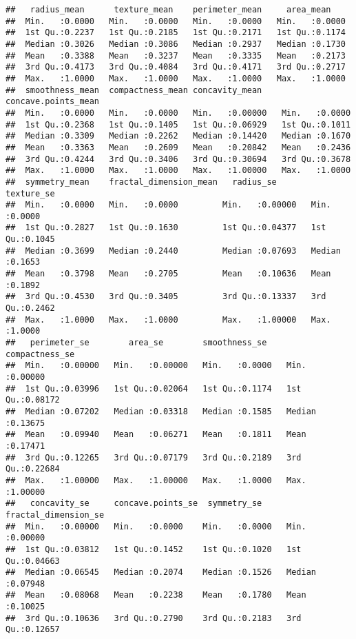 \documentclass[
]{article}
\begin{document}
\begin{verbatim}
##   radius_mean      texture_mean    perimeter_mean     area_mean     
##  Min.   :0.0000   Min.   :0.0000   Min.   :0.0000   Min.   :0.0000  
##  1st Qu.:0.2237   1st Qu.:0.2185   1st Qu.:0.2171   1st Qu.:0.1174  
##  Median :0.3026   Median :0.3086   Median :0.2937   Median :0.1730  
##  Mean   :0.3388   Mean   :0.3237   Mean   :0.3335   Mean   :0.2173  
##  3rd Qu.:0.4173   3rd Qu.:0.4084   3rd Qu.:0.4171   3rd Qu.:0.2717  
##  Max.   :1.0000   Max.   :1.0000   Max.   :1.0000   Max.   :1.0000  
##  smoothness_mean  compactness_mean concavity_mean    concave.points_mean
##  Min.   :0.0000   Min.   :0.0000   Min.   :0.00000   Min.   :0.0000     
##  1st Qu.:0.2368   1st Qu.:0.1405   1st Qu.:0.06929   1st Qu.:0.1011     
##  Median :0.3309   Median :0.2262   Median :0.14420   Median :0.1670     
##  Mean   :0.3363   Mean   :0.2609   Mean   :0.20842   Mean   :0.2436     
##  3rd Qu.:0.4244   3rd Qu.:0.3406   3rd Qu.:0.30694   3rd Qu.:0.3678     
##  Max.   :1.0000   Max.   :1.0000   Max.   :1.00000   Max.   :1.0000     
##  symmetry_mean    fractal_dimension_mean   radius_se         texture_se    
##  Min.   :0.0000   Min.   :0.0000         Min.   :0.00000   Min.   :0.0000  
##  1st Qu.:0.2827   1st Qu.:0.1630         1st Qu.:0.04377   1st Qu.:0.1045  
##  Median :0.3699   Median :0.2440         Median :0.07693   Median :0.1653  
##  Mean   :0.3798   Mean   :0.2705         Mean   :0.10636   Mean   :0.1892  
##  3rd Qu.:0.4530   3rd Qu.:0.3405         3rd Qu.:0.13337   3rd Qu.:0.2462  
##  Max.   :1.0000   Max.   :1.0000         Max.   :1.00000   Max.   :1.0000  
##   perimeter_se        area_se        smoothness_se    compactness_se   
##  Min.   :0.00000   Min.   :0.00000   Min.   :0.0000   Min.   :0.00000  
##  1st Qu.:0.03996   1st Qu.:0.02064   1st Qu.:0.1174   1st Qu.:0.08172  
##  Median :0.07202   Median :0.03318   Median :0.1585   Median :0.13675  
##  Mean   :0.09940   Mean   :0.06271   Mean   :0.1811   Mean   :0.17471  
##  3rd Qu.:0.12265   3rd Qu.:0.07179   3rd Qu.:0.2189   3rd Qu.:0.22684  
##  Max.   :1.00000   Max.   :1.00000   Max.   :1.0000   Max.   :1.00000  
##   concavity_se     concave.points_se  symmetry_se     fractal_dimension_se
##  Min.   :0.00000   Min.   :0.0000    Min.   :0.0000   Min.   :0.00000     
##  1st Qu.:0.03812   1st Qu.:0.1452    1st Qu.:0.1020   1st Qu.:0.04663     
##  Median :0.06545   Median :0.2074    Median :0.1526   Median :0.07948     
##  Mean   :0.08068   Mean   :0.2238    Mean   :0.1780   Mean   :0.10025     
##  3rd Qu.:0.10636   3rd Qu.:0.2790    3rd Qu.:0.2183   3rd Qu.:0.12657     

\end{verbatim}
\end{document}
